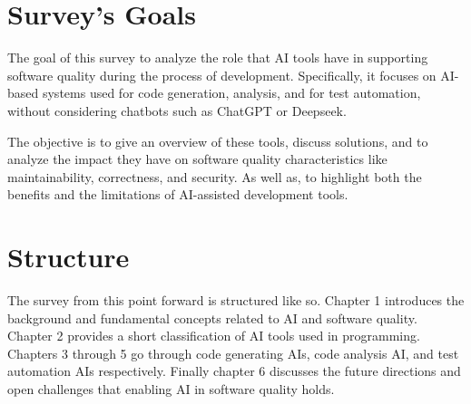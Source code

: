 \section*{Survey's Goals}

The goal of this survey to analyze the role that AI tools have in supporting software quality during the process of development. Specifically, it focuses on AI-based systems used for code generation, analysis, and for test automation, without considering chatbots such as ChatGPT or Deepseek.

The objective is to give an overview of these tools, discuss solutions, and to analyze the impact they have on software quality characteristics like maintainability, correctness, and security. As well as, to highlight both the benefits and the limitations of AI-assisted development tools.

\section*{Structure}

The survey from this point forward is structured like so. Chapter 1 introduces the background and fundamental concepts related to AI and software quality. Chapter 2 provides a short classification of AI tools used in programming. Chapters 3 through 5 go through code generating AIs, code analysis AI, and test automation AIs respectively. Finally chapter 6 discusses the future directions and open challenges that enabling AI in software quality holds.